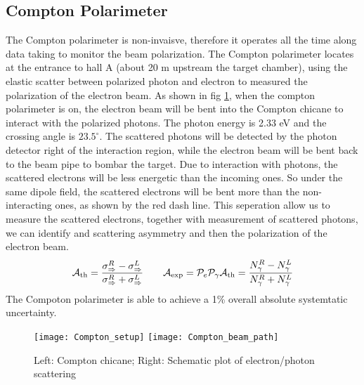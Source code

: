 \subsection{Compton Polarimeter}
The Compton polarimeter is non-invaisve, therefore it
operates all the time along data taking to monitor the beam polarization. The
Compton polarimeter locates at the entrance to hall A (about 20 m upstream the 
target chamber), using the elastic scatter between polarized photon and electron
to measured the polarization of the electron beam. As shown in fig \ref{fig:compton_pol},
when the compton polarimeter is on, the electron beam will be bent into the 
Compton chicane to interact with the polarized photons. The photon energy is 
2.33 eV and the crossing angle is $23.5^\circ$. The scattered photons will be
detected by the photon detector right of the interaction region, while the
electron beam will be bent back to the beam pipe to bombar the target. Due to
interaction with photons, the scattered electrons will be less energetic than
the incoming ones. So under the same dipole field, the scattered electrons will
be bent more than the non-interacting ones, as shown by the red dash line. This 
seperation allow us to measure the scattered electrons, together with measurement
of scattered photons, we can identify and scattering asymmetry and then the polarization
of the electron beam.
\begin{equation*}
    \mathcal{A}_{\text{th}} = \frac{\sigma_{\Rightarrow}^{R} - \sigma_{\Rightarrow}^{L}}{\sigma_{\Rightarrow}^{R} + \sigma_{\Rightarrow}^{L}}  \qquad
    \mathcal{A}_{\text{exp}} = \mathcal{P}_{e}\mathcal{P}_{\gamma}\mathcal{A}_{\text{th}} = \frac{N_{\gamma}^R - N_{\gamma}^L}{N_{\gamma}^R + N_{\gamma}^L}
\end{equation*}
The Compoton polarimeter is able to achieve a 1\% overall absolute systemtatic
uncertainty.
\begin{figure}[h!]
    \texttt{[image: Compton\_setup]}
    \texttt{[image: Compton\_beam\_path]}
    \caption{Left: Compton chicane; Right: Schematic plot of electron/photon 
    scattering} 
    \label{fig:compton_pol}
\end{figure}

